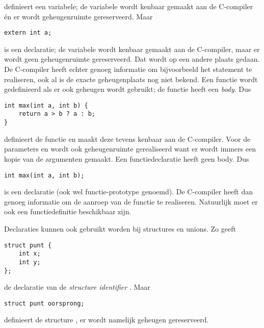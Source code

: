 definieert een variabele; de variabele wordt kenbaar gemaakt aan de C-compiler én er wordt geheugenruimte gereserveerd. Maar

\begin{lstlisting}[style=lstoneline]
extern int a;
\end{lstlisting}

is een declaratie; de variabele wordt kenbaar gemaakt aan de C-compiler, maar er wordt geen geheugenruimte gereserveerd. Dat wordt op een andere plaats gedaan. De C-compiler heeft echter genoeg informatie om bijvoorbeeld het statement  te realiseren, ook al is de exacte geheugenplaats nog niet bekend. Een functie wordt gedefinieerd als er ook geheugen wordt gebruikt; de functie heeft een \textsl{body}. Dus

\begin{lstlisting}[style=lstoneline]
int max(int a, int b) {
    return a > b ? a : b;
}
\end{lstlisting}

definieert de functie  en maakt deze tevens kenbaar aan de C-compiler. Voor de parameters  en  wordt ook geheugenruimte gerealiseerd want er wordt immers een kopie van de argumenten gemaakt. Een functiedeclaratie heeft geen body. Dus

\begin{lstlisting}[style=lstoneline]
int max(int a, int b);
\end{lstlisting}

is een declaratie (ook wel functie-prototype genoemd). De C-compiler heeft dan genoeg informatie om de aanroep van de functie te realiseren. Natuurlijk moet er ook een functiedefinitie beschikbaar zijn.

Declaraties kunnen ook gebruikt worden bij structures en unions. Zo geeft

\begin{lstlisting}[style=lstoneline]
struct punt {
    int x;
    int y;
};
\end{lstlisting}

de declaratie van de \textsl{structure identifier} . Maar

\begin{lstlisting}[style=lstoneline]
struct punt oorsprong;
\end{lstlisting}

definieert de structure , er wordt namelijk geheugen gereserveerd.

